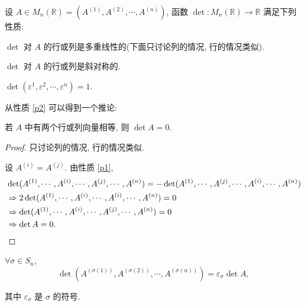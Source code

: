 \documentclass{ctexart}
\begin{document}
设 $A\in M_n(\mathbb{R})=(A^{(1)},A^{(2)},\cdots,A^{(n)})$, 函数 $\det:M_n(\mathbb{R})\to\mathbb{R}$ 满足下列性质:
\begin{property}\label{p1}
    $\det$ 对 $A$ 的行或列是多重线性的(下面只讨论列的情况, 行的情况类似).
\end{property}
\begin{property}\label{p2}
    $\det$ 对 $A$ 的行或列是斜对称的.
\end{property}
\begin{property}\label{p3}
    $\det(\varepsilon^1,\varepsilon^2,\cdots,\varepsilon^n)=1$.
\end{property}
从性质 \ref{p2} 可以得到一个推论:
\begin{corollary}\label{c1}
    若 $A$ 中有两个行或列向量相等, 则 $\det A=0$.
\end{corollary}
\begin{proof}
    只讨论列的情况, 行的情况类似.

    设 $A^{(i)}=A^{(j)}$. 由性质 \ref{p1},
    \begin{align*}
        & \det(A^{(1)},\cdots,A^{(i)},\cdots,A^{(j)},\cdots,A^{(n)})=-\det(A^{(1)},\cdots,A^{(j)},\cdots,A^{(i)},\cdots,A^{(n)}) \\
        & \Rightarrow2\det(A^{(1)},\cdots,A^{(i)},\cdots,A^{(i)},\cdots,A^{(n)})=0 \\
        & \Rightarrow\det(A^{(1)},\cdots,A^{(i)},\cdots,A^{(j)},\cdots,A^{(n)})=0 \\
        & \Rightarrow\det A=0.\qedhere
    \end{align*}
\end{proof}
\begin{corollary}\label{c2}
    $\forall\sigma\in S_n$,
    \[\det(A^{(\sigma(1))},A^{(\sigma(2))},\cdots,A^{(\sigma(n))})=\varepsilon_\sigma\det A,\]

    其中 $\varepsilon_\sigma$ 是 $\sigma$ 的符号.
\end{corollary}
\end{document}
